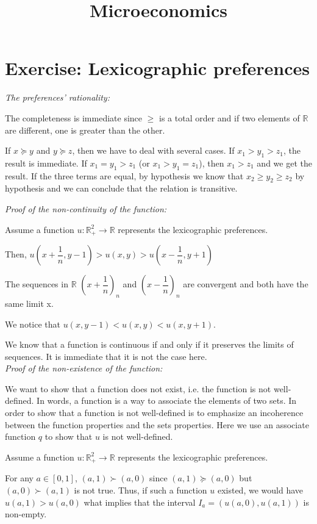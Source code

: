 \documentclass[11pt]{article} %
\title{Microeconomics }
\begin{document}
\maketitle


\section*{Exercise: Lexicographic preferences }
\textit{The preferences' rationality:}

The completeness is immediate since $\geq $ is a total order and if two elements of $ \mathbb{R} $ are different, one is greater than the other.

If $ x \succeq y $ and  $ y \succeq z $, then we have to deal with several cases. If $ x_1 > y_1 > z_1$, the result is immediate. If $ x_1 = y_1 > z_1$ (or $ x_1 > y_1 = z_1$), then $ x_1 > z_1$ and we get the result. If the three terms are equal, by hypothesis we know that $ x_2 \geq y_2 \geq z_2$ by hypothesis and we can conclude that the relation is transitive. 


\textit{Proof of the non-continuity of the function:}

Assume a function $u : \mathbb{R}^2_+ \rightarrow \mathbb{R} $ represents the lexicographic preferences.

Then, $ u(x + \dfrac{1}{n}, y-1) > u(x , y) > u(x - \dfrac{1}{n}, y+1) $

The sequences in $\mathbb{R}$  $(x + \dfrac{1}{n})_n$ and $(x - \dfrac{1}{n})_n$ are convergent and both have the same limit x. 

We notice that $ u(x , y-1)< u(x , y) < u(x , y+1) $.

We know that a function is continuous if and only if it preserves the limits of sequences. It is immediate that it is not the case here.\\

\textit{Proof of the non-existence of the function:}

We want to show that a function does not exist, i.e. the function is not well-defined. In words, a function is a way to associate the elements of two sets. In order to show that a function is not well-defined is to emphasize an incoherence between the function properties and the sets properties. Here we use an associate function $q$ to show that $u$ is not well-defined.

Assume a function  $u : \mathbb{R}^2_+ \rightarrow \mathbb{R} $ represents the lexicographic preferences.

For any $a \in [0,1]$, $ (a, 1) \succ (a, 0)$ since $ (a, 1) \succeq (a, 0)$ but $ (a, 0) \succ (a, 1)$ is not true. Thus, if such a function $ u$ existed, we would have $ u(a, 1) > u(a, 0)$ what implies that the interval $I_a = (u(a, 0), u(a, 1))$ is non-empty.
\end{document}
